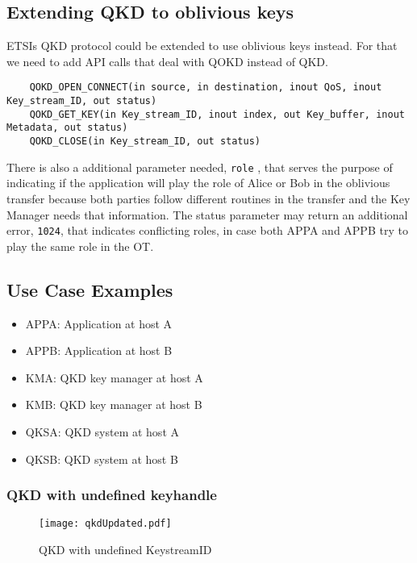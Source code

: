 \begin{refsection}
\subsection{Extending QKD to oblivious keys}

ETSIs QKD protocol could be extended to use oblivious keys instead. For that we need to add API calls that deal with QOKD instead of QKD.

\begin{lstlisting}
	QOKD_OPEN_CONNECT(in source, in destination, inout QoS, inout Key_stream_ID, out status)
	QOKD_GET_KEY(in Key_stream_ID, inout index, out Key_buffer, inout Metadata, out status)
	QOKD_CLOSE(in Key_stream_ID, out status)
\end{lstlisting}

There is also a additional parameter needed, \texttt{role} , that serves the purpose of indicating if the application will play the role of Alice or Bob in the oblivious transfer because both parties follow different routines in the transfer and the Key Manager needs that information. 
The status parameter may return an additional error, \texttt{1024}, that indicates conflicting roles, in case both APPA and APPB try to play the same role in the OT.

\subsection{Use Case Examples}

\begin{itemize}
	\item
	APPA: Application at host A
	\item
	APPB: Application at host B
	\item
	KMA: QKD key manager at host A
	\item
	KMB: QKD key manager at host B
	\item
	QKSA: QKD system at host A
	\item
	QKSB: QKD system at host B
\end{itemize}

\subsubsection{QKD with undefined key\textunderscore handle}

\begin{figure}[H]
	\centering
	\texttt{[image: qkdUpdated.pdf]}
	\caption{QKD with undefined Key\textunderscore stream\textunderscore ID}
	\label{fig:QKDUndefinedKSID}
\end{figure}


\end{refsection}
